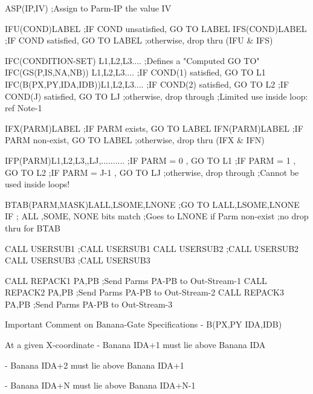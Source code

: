    ASP(IP,IV)                        ;Assign to Parm-IP the value IV
 
   IFU(COND)LABEL                    ;IF COND  unsatisfied, GO TO LABEL
   IFS(COND)LABEL                    ;IF COND    satisfied, GO TO LABEL
                                     ;otherwise, drop thru (IFU & IFS)
 
   IFC(CONDITION-SET)   L1,L2,L3.... ;Defines a "Computed GO TO"
   IFC(GS(P,IS,NA,NB))  L1,L2,L3.... ;IF COND(1) satisfied, GO TO L1
   IFC(B(PX,PY,IDA,IDB))L1,L2,L3.... ;IF COND(2) satisfied, GO TO L2
                                     ;IF COND(J) satisfied, GO TO LJ
                                     ;otherwise, drop through
                                     ;Limited use inside loop: ref Note-1
 
   IFX(PARM)LABEL                    ;IF PARM       exists, GO TO LABEL
   IFN(PARM)LABEL                    ;IF PARM    non-exist, GO TO LABEL
                                     ;otherwise, drop thru (IFX & IFN)
 
   IFP(PARM)L1,L2,L3,,LJ,..........  ;IF PARM = 0         , GO TO L1
                                     ;IF PARM = 1         , GO TO L2
                                     ;IF PARM = J-1       , GO TO LJ
                                     ;otherwise, drop through
                                     ;Cannot be used inside loops!
 
   BTAB(PARM,MASK)LALL,LSOME,LNONE   ;GO TO LALL,LSOME,LNONE IF
                                     ;       ALL ,SOME, NONE bits match
                                     ;Goes to LNONE if Parm non-exist
                                     ;no drop thru for BTAB
 
   CALL USERSUB1                     ;CALL USERSUB1
   CALL USERSUB2                     ;CALL USERSUB2
   CALL USERSUB3                     ;CALL USERSUB3
 
   CALL REPACK1   PA,PB              ;Send Parms PA-PB to Out-Stream-1
   CALL REPACK2   PA,PB              ;Send Parms PA-PB to Out-Stream-2
   CALL REPACK3   PA,PB              ;Send Parms PA-PB to Out-Stream-3
 
 
   Important Comment on Banana-Gate Specifications - B(PX,PY IDA,IDB)
 
   At a given X-coordinate - Banana IDA+1 must lie above Banana IDA
 
                           - Banana IDA+2 must lie above Banana IDA+1
 
                           - Banana IDA+N must lie above Banana IDA+N-1
 
